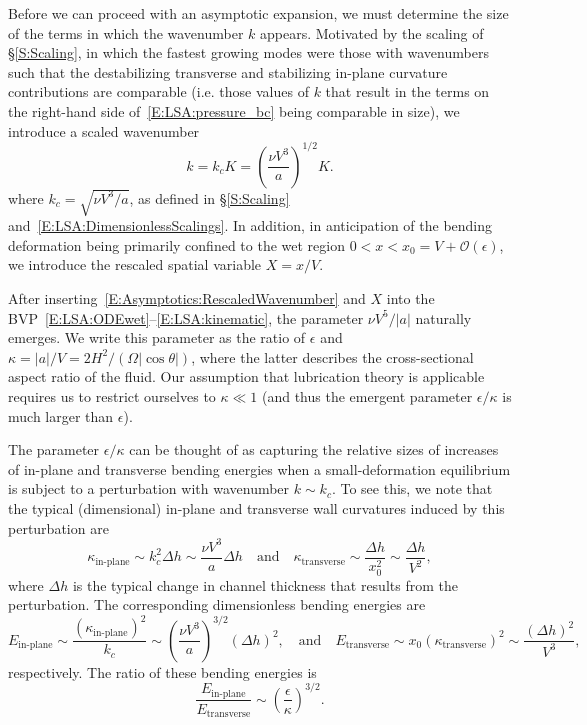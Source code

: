 \documentclass{jfm}
\begin{document}
Before we can proceed with an asymptotic expansion, we must determine the size of the terms in which the wavenumber $k$ appears. Motivated by the scaling of \S\ref{S:Scaling}, in which the fastest growing modes were those with wavenumbers such that the destabilizing transverse and stabilizing in-plane curvature contributions are comparable (i.e. those values of $k$ that result in the terms on the right-hand side of~\eqref{E:LSA:pressure_bc} being comparable in size), we introduce a scaled wavenumber
\begin{equation}\label{E:Asymptotics:RescaledWavenumber}
k = k_c K = \left(\frac{\nu V^3}{a}\right)^{1/2} K.
\end{equation}
where $k_c = \sqrt{\nu V^3 /a}$, as defined in \S\ref{S:Scaling} and~\eqref{E:LSA:DimensionlessScalings}. In addition, in anticipation of the bending deformation being primarily confined to the wet region $0 < x < x_0 = V + \mathcal{O}(\epsilon)$, we introduce the rescaled spatial variable $X = x/V$. 

After inserting~\eqref{E:Asymptotics:RescaledWavenumber} and $X$ into the BVP~\eqref{E:LSA:ODEwet}--\eqref{E:LSA:kinematic}, the parameter $\nu V^5/|a|$ naturally emerges. We write this parameter as the ratio of $\epsilon$ and $\kappa =|a|/V = 2H^2/ (\Omega |\cos \theta| )$, where the latter describes the cross-sectional aspect ratio of the fluid. Our assumption that lubrication theory is applicable requires us to restrict ourselves to $\kappa \ll 1$ (and thus the emergent parameter $ \epsilon / \kappa $ is much larger than $\epsilon$). 

The parameter $\epsilon/\kappa$ can be thought of as capturing the relative sizes of increases of in-plane and transverse bending energies when a small-deformation equilibrium is subject to a perturbation with wavenumber $k \sim k_c$.  To see this, we note that the typical (dimensional) in-plane and transverse wall curvatures induced by this perturbation are
\begin{equation}
\kappa_{\text{in-plane}} \sim k_c^2 \Delta h \sim \frac{\nu V^3}{a} \Delta h \quad \text{and}\quad \kappa_{\text{transverse}} \sim \frac{\Delta h}{x_0^2} \sim  \frac{\Delta h}{V^2},
\end{equation}
where $\Delta h$ is the typical change in channel thickness that results from the perturbation. The corresponding dimensionless bending energies are
\begin{equation}
E_{\text{in-plane}} \sim \frac{\left(\kappa_{\text{in-plane}}\right)^2}{k_c} \sim \left( \frac{\nu V^3}{a}\right)^{3/2}(\Delta h)^2,  \quad \text{and}\quad
E_{\text{transverse}} \sim x_0 \left(\kappa_{\text{transverse}}\right)^2 \sim \frac{(\Delta h)^2}{V^3},
\end{equation}
respectively. The ratio of these bending energies is 
\begin{equation}
\frac{E_{\text{in-plane}}}{ E_{\text{transverse}}}
\sim \left(\frac{\epsilon}{\kappa}\right)^{3/2}.
\end{equation}
\end{document}
